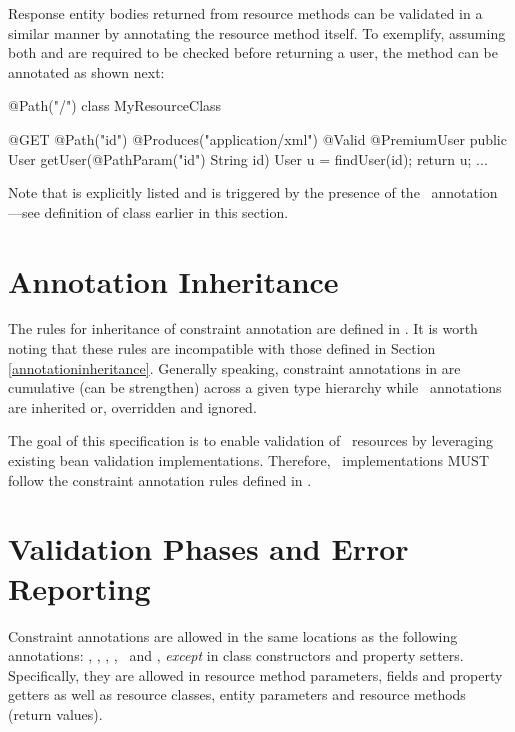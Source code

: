 Response entity bodies returned from resource methods can be validated in a similar manner by annotating the resource method itself. To exemplify, assuming both  and  are required to be checked before returning a user, the  method can be annotated as shown next:

\begin{listing}{1}
@Path("/")
class MyResourceClass {

  @GET
  @Path("{id}")
  @Produces("application/xml")
  @Valid @PremiumUser
  public User getUser(@PathParam("id") String id) {
    User u = findUser(id);
    return u;
  }
  ...
}
\end{listing}

Note that  is explicitly listed and  is triggered by the presence of the \Valid\ annotation ---see definition of  class earlier in this section.

\section{Annotation Inheritance}

The rules for inheritance of constraint annotation are defined in \cite{bv11}. It is worth noting that these rules are incompatible with those defined in Section \ref{annotationinheritance}. Generally speaking, constraint annotations in \cite{bv11} are cumulative (can be strengthen) across a given type hierarchy while \jaxrs\ annotations are inherited or, overridden and ignored.

The goal of this specification is to enable validation of \jaxrs\ resources by leveraging existing bean validation implementations. Therefore, \jaxrs\ implementations MUST follow the constraint annotation rules defined in \cite{bv11}.

\section{Validation Phases and Error Reporting}
\label{validation_phases_and_error_reporting}

Constraint annotations are allowed in the same locations as the following annotations: \MatrixParam, \QueryParam, \PathParam, \CookieParam, \HeaderParam\ and \Context, {\em except} in class constructors and property setters. Specifically, they are allowed in resource method parameters, fields and property getters as well as resource classes, entity parameters and resource methods (return values). 

